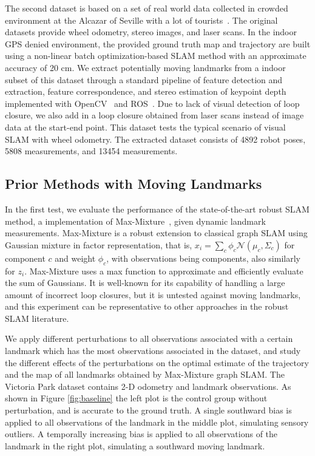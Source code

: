 The second dataset is based on a set of real world data collected in crowded
environment at the Alcazar of Seville with a lot of tourists~\cite{iros14-frog}.
The original datasets provide wheel odometry, stereo images, and laser scans.
In the indoor GPS denied environment, the provided ground truth map and
trajectory are built using a non-linear batch optimization-based SLAM method
with an approximate accuracy of 20 cm. We extract potentially moving landmarks
from a indoor subset of this dataset through a standard pipeline of feature
detection and extraction, feature correspondence, and stereo estimation of
keypoint depth implemented with OpenCV~\cite{opencv} and ROS~\cite{ros}.  Due to lack of visual detection of loop closure, we also add
in a loop closure obtained from laser scans instead of image data at the
start-end point. This dataset tests the typical scenario of visual SLAM with
wheel odometry. The extracted dataset consists of 4892 robot poses, 5808
measurements, and 13454 measurements.

\subsection{Prior Methods with Moving Landmarks}

In the first test, we evaluate the performance of the state-of-the-art robust
SLAM method, a implementation of Max-Mixture~\cite{mm}, given dynamic landmark measurements.
Max-Mixture is a robust extension to classical graph SLAM using Gaussian
mixture in factor representation, that is, $ x_i = \sum_c \phi_c
\mathcal{N}(\mu_c, \Sigma_c)$ for component $c$ and weight $\phi_c$, with
observations being components, also similarly for $z_i$. Max-Mixture uses a max
function to approximate and efficiently evaluate the sum of Gaussians. It is
well-known for its capability of handling a large amount of incorrect loop
closures, but it is untested against moving landmarks, and this experiment can
be representative to other approaches in the robust SLAM literature. 

We apply different perturbations to all observations associated with a certain
landmark which has the most observations associated in the dataset, and study
the different effects of the perturbations on the optimal estimate of the
trajectory and the map of all landmarks obtained by Max-Mixture graph SLAM. The
Victoria Park dataset contains 2-D odometry and landmark observations. As shown
in Figure \ref{fig:baseline} the left plot is the control group without
perturbation, and is accurate to the ground truth. A single southward bias is
applied to all observations of the landmark in the middle plot, simulating
sensory outliers. A temporally increasing bias is applied to all observations
of the landmark in the right plot, simulating a southward moving landmark.

